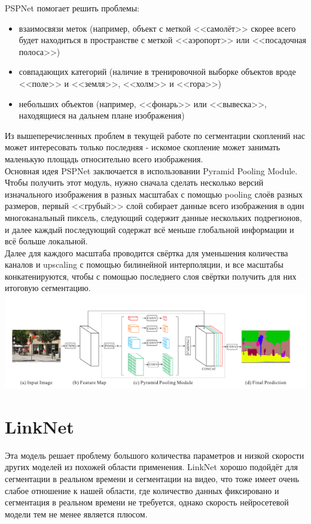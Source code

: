 \documentclass{article}
\begin{document}
PSPNet помогает решить проблемы:\\
\begin{itemize}
    \item взаимосвязи меток (например, объект 
        с меткой <<самолёт>> скорее всего будет находиться в пространстве с меткой <<аэропорт>> или 
        <<посадочная полоса>>)\\
    \item совпадающих категорий (наличие в тренировочной выборке объектов вроде <<поле>> и <<земля>>, 
        <<холм>> и <<гора>>)\\
    \item небольших объектов (например, <<фонарь>> или <<вывеска>>, находящиеся на дальнем плане 
        изображения)\\
\end{itemize}

Из вышеперечисленных проблем в текущей работе по сегментации скоплений нас может интересовать только 
последняя - искомое скопление может занимать маленькую площадь относительно всего изображения.\\

Основная идея PSPNet заключается в использовании Pyramid Pooling Module. Чтобы получить этот модуль, 
нужно сначала сделать несколько версий изначального изображения в разных масштабах с помощью pooling 
слоёв разных размеров, первый <<грубый>> слой собирает данные всего изображения в один многоканальный 
пиксель, следующий содержит данные нескольких подрегионов, и далее каждый последующий содержат всё 
меньше глобальной информации и всё больше локальной. \\

Далее для каждого масштаба проводится свёртка для уменьшения количества каналов и upscaling с помощью 
билинейной интерполяции, и все масштабы конкатенируются, чтобы с помощью последнего слоя свёртки 
получить для них итоговую сегментацию. \\

\includegraphics[width=\linewidth]{ppm}

\section{LinkNet}
Эта модель решает проблему большого количества параметров и низкой скорости других моделей из 
похожей области применения. LinkNet хорошо подойдёт для сегментации в реальном времени и сегментации 
на видео, что тоже имеет очень слабое отношение к нашей области, где количество данных фиксировано и 
сегментация в реальном времени не требуется, однако скорость нейросетевой модели тем не менее является 
плюсом.\\
\end{document}
